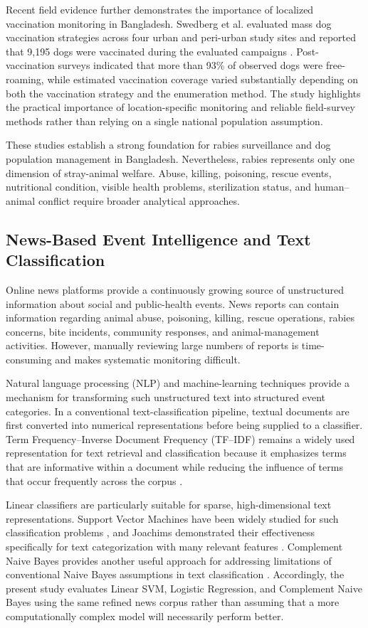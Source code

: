 \documentclass[conference]{IEEEtran}
\begin{document}
Recent field evidence further demonstrates the importance of localized
vaccination monitoring in Bangladesh. Swedberg et al. evaluated mass dog
vaccination strategies across four urban and peri-urban study sites and
reported that 9,195 dogs were vaccinated during the evaluated campaigns
\cite{swedberg2026}. Post-vaccination surveys indicated that more than 93\%
of observed dogs were free-roaming, while estimated vaccination coverage
varied substantially depending on both the vaccination strategy and the
enumeration method. The study highlights the practical importance of
location-specific monitoring and reliable field-survey methods rather than
relying on a single national population assumption.

These studies establish a strong foundation for rabies surveillance and dog
population management in Bangladesh. Nevertheless, rabies represents only one
dimension of stray-animal welfare. Abuse, killing, poisoning, rescue events,
nutritional condition, visible health problems, sterilization status, and
human--animal conflict require broader analytical approaches.

\subsection{News-Based Event Intelligence and Text Classification}

Online news platforms provide a continuously growing source of unstructured
information about social and public-health events. News reports can contain
information regarding animal abuse, poisoning, killing, rescue operations,
rabies concerns, bite incidents, community responses, and animal-management
activities. However, manually reviewing large numbers of reports is
time-consuming and makes systematic monitoring difficult.

Natural language processing (NLP) and machine-learning techniques provide a
mechanism for transforming such unstructured text into structured event
categories. In a conventional text-classification pipeline, textual documents
are first converted into numerical representations before being supplied to a
classifier. Term Frequency--Inverse Document Frequency (TF--IDF) remains a
widely used representation for text retrieval and classification because it
emphasizes terms that are informative within a document while reducing the
influence of terms that occur frequently across the corpus
\cite{salton1988}.

Linear classifiers are particularly suitable for sparse, high-dimensional
text representations. Support Vector Machines have been widely studied for
such classification problems \cite{cortes1995}, and Joachims demonstrated
their effectiveness specifically for text categorization with many relevant
features \cite{joachims1998}. Complement Naive Bayes provides another useful
approach for addressing limitations of conventional Naive Bayes assumptions
in text classification \cite{rennie2003}. Accordingly, the present study
evaluates Linear SVM, Logistic Regression, and Complement Naive Bayes using
the same refined news corpus rather than assuming that a more computationally
complex model will necessarily perform better.
\end{document}

